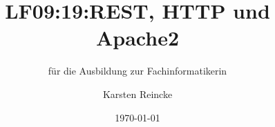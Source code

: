 \documentclass[]{beamer}
\title{LF09:19:REST, HTTP und Apache2}
\subtitle{für die Ausbildung zur Fachinformatikerin}
\institute{GS-LDK}
\author{Karsten Reincke}
\date{\today}
\def\cfgGl{../../../cfg.gl/}
\begin{document}

\begin{frame}
  \titlepage

  
\end{frame}






\logo{}
\newpage



%
\end{document}
